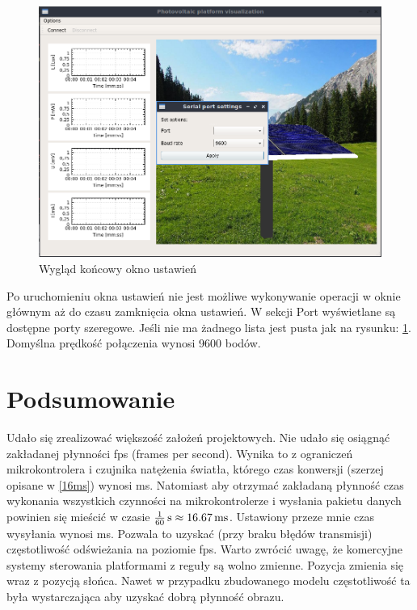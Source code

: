 \documentclass[10pt, a4paper]{article}
\begin{document}
		\begin{figure}[H]
			\centering
			\includegraphics[width=1.0\textwidth]{figures/options.png}
			\caption{Wygląd końcowy okno ustawień}
			\label{fig:settings}
		\end{figure}
	Po uruchomieniu okna ustawień nie jest możliwe wykonywanie operacji w oknie głównym aż do czasu zamknięcia okna ustawień. W sekcji Port wyświetlane są dostępne porty szeregowe. Jeśli nie ma żadnego lista jest pusta jak na rysunku: \ref{fig:settings}. Domyślna prędkość połączenia wynosi 9600 bodów.
	\section{Podsumowanie}
	Udało się zrealizować większość założeń projektowych. Nie udało się osiągnąć zakładanej płynności \unit[60]{fps} (frames per second). Wynika to z ograniczeń mikrokontrolera i czujnika natężenia światła, którego czas konwersji (szerzej opisane w \ref{16ms}) wynosi \unit[16]{ms}. Natomiast aby otrzymać zakładaną płynność czas wykonania wszystkich czynności na mikrokontrolerze i wysłania pakietu danych powinien się mieścić w czasie $\unit[\frac{1}{60}]{s} \approx \unit[16.67]{ms}$.
	Ustawiony przeze mnie czas wysyłania wynosi \unit[50]{ms}. Pozwala to uzyskać (przy braku błędów transmisji) częstotliwość odświeżania na poziomie \unit[20]{fps}. Warto zwrócić uwagę, że komercyjne systemy sterowania platformami z reguły  są wolno zmienne. Pozycja zmienia się wraz z pozycją słońca. Nawet w przypadku zbudowanego modelu częstotliwość ta była wystarczająca aby uzyskać dobrą płynność obrazu.
	
\end{document}
